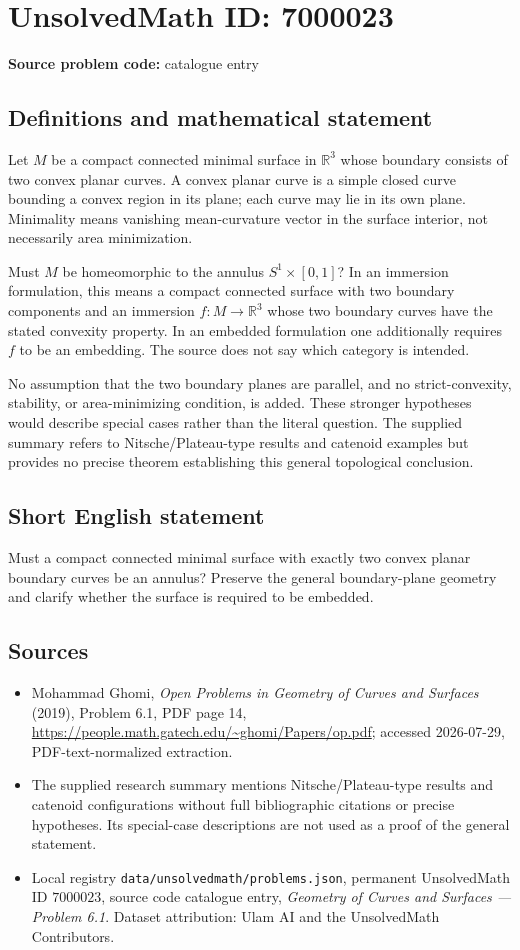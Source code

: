 \documentclass[11pt]{article}
\begin{document}
\section*{UnsolvedMath ID: 7000023}
\textbf{Source problem code:} catalogue entry
\subsection{Definitions and mathematical statement}
Let $M$ be a compact connected minimal surface in $\mathbb R^3$ whose boundary consists of two convex planar curves. A convex planar curve is a simple closed curve bounding a convex region in its plane; each curve may lie in its own plane. Minimality means vanishing mean-curvature vector in the surface interior, not necessarily area minimization.

Must $M$ be homeomorphic to the annulus $S^1\times[0,1]$? In an immersion formulation, this means a compact connected surface with two boundary components and an immersion $f:M\to\mathbb R^3$ whose two boundary curves have the stated convexity property. In an embedded formulation one additionally requires $f$ to be an embedding. The source does not say which category is intended.

No assumption that the two boundary planes are parallel, and no strict-convexity, stability, or area-minimizing condition, is added. These stronger hypotheses would describe special cases rather than the literal question. The supplied summary refers to Nitsche/Plateau-type results and catenoid examples but provides no precise theorem establishing this general topological conclusion.
\subsection{Short English statement}
Must a compact connected minimal surface with exactly two convex planar boundary curves be an annulus? Preserve the general boundary-plane geometry and clarify whether the surface is required to be embedded.
\subsection{Sources}
\begin{itemize}
\item Mohammad Ghomi, \emph{Open Problems in Geometry of Curves and Surfaces} (2019), Problem 6.1, PDF page 14, \url{https://people.math.gatech.edu/~ghomi/Papers/op.pdf}; accessed 2026-07-29, PDF-text-normalized extraction.
\item The supplied research summary mentions Nitsche/Plateau-type results and catenoid configurations without full bibliographic citations or precise hypotheses. Its special-case descriptions are not used as a proof of the general statement.
\item Local registry \texttt{data/unsolvedmath/problems.json}, permanent UnsolvedMath ID $7000023$, source code catalogue entry, \emph{Geometry of Curves and Surfaces --- Problem 6.1}. Dataset attribution: Ulam AI and the UnsolvedMath Contributors.
\end{itemize}
\end{document}
